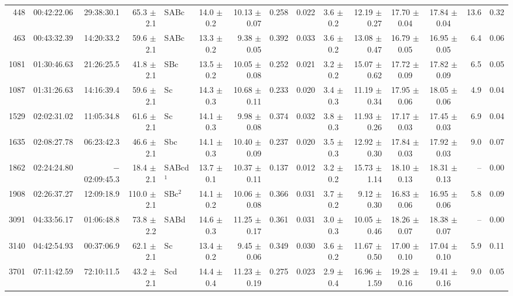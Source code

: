 \begin{table}
{\begin{tabular}{|rrrrlcrcccrccrc|}
\hline  
  448 & 00:42:22.06 & 29:38:30.1 &  65.3 $\pm$ 2.1 & SABc      & 14.0 $\pm$ 0.2 & 10.13 $\pm$ 0.07 & 0.258 & 0.022 & 3.6 $\pm$ 0.2 & 12.19 $\pm$ 0.27 & 17.70 $\pm$ 0.04 & 17.84 $\pm$ 0.04 & 13.6 & 0.32 \\
  463 & 00:43:32.39 & 14:20:33.2 &  59.6 $\pm$ 2.1 & SABc      & 13.3 $\pm$ 0.2 &  9.38 $\pm$ 0.05 & 0.392 & 0.033 & 3.6 $\pm$ 0.2 & 13.08 $\pm$ 0.47 & 16.79 $\pm$ 0.05 & 16.95 $\pm$ 0.05 & 6.4  & 0.06 \\
 1081 & 01:30:46.63 & 21:26:25.5 &  41.8 $\pm$ 2.1 & SBc       & 13.5 $\pm$ 0.2 & 10.05 $\pm$ 0.08 & 0.252 & 0.021 & 3.2 $\pm$ 0.2 & 15.07 $\pm$ 0.62 & 17.72 $\pm$ 0.09 & 17.82 $\pm$ 0.09 & 6.5  & 0.05 \\
 1087 & 01:31:26.63 & 14:16:39.4 &  59.6 $\pm$ 2.1 & Sc        & 14.3 $\pm$ 0.3 & 10.68 $\pm$ 0.11 & 0.233 & 0.020 & 3.4 $\pm$ 0.3 & 11.19 $\pm$ 0.34 & 17.95 $\pm$ 0.06 & 18.05 $\pm$ 0.06 & 4.9  & 0.04 \\
 1529 & 02:02:31.02 & 11:05:34.8 &  61.6 $\pm$ 2.1 & Sc        & 14.1 $\pm$ 0.3 &  9.98 $\pm$ 0.08 & 0.374 & 0.032 & 3.8 $\pm$ 0.3 & 11.93 $\pm$ 0.26 & 17.17 $\pm$ 0.03 & 17.45 $\pm$ 0.03 & 6.9  & 0.04 \\
 1635 & 02:08:27.78 & 06:23:42.3 &  46.6 $\pm$ 2.1 & Sbc       & 14.1 $\pm$ 0.3 & 10.40 $\pm$ 0.09 & 0.237 & 0.020 & 3.5 $\pm$ 0.3 & 12.92 $\pm$ 0.30 & 17.84 $\pm$ 0.03 & 17.92 $\pm$ 0.03 & 9.0  & 0.07 \\
 1862 & 02:24:24.80 &$-$02:09:45.3& 18.4 $\pm$ 2.1 & SABcd$^1$ & 13.7 $\pm$ 0.1 & 10.37 $\pm$ 0.11 & 0.137 & 0.012 & 3.2 $\pm$ 0.2 & 15.73 $\pm$ 1.14 & 18.10 $\pm$ 0.13 & 18.31 $\pm$ 0.13 & --   & 0.00 \\
 1908 & 02:26:37.27 & 12:09:18.9 & 110.0 $\pm$ 2.1 & SBc$^2$   & 14.1 $\pm$ 0.2 & 10.06 $\pm$ 0.08 & 0.366 & 0.031 & 3.7 $\pm$ 0.2 &  9.12 $\pm$ 0.30 & 16.83 $\pm$ 0.06 & 16.95 $\pm$ 0.06 & 5.8  & 0.09 \\
 3091 & 04:33:56.17 & 01:06:48.8 &  73.8 $\pm$ 2.2 & SABd      & 14.6 $\pm$ 0.3 & 11.25 $\pm$ 0.17 & 0.361 & 0.031 & 3.0 $\pm$ 0.3 & 10.05 $\pm$ 0.46 & 18.26 $\pm$ 0.07 & 18.38 $\pm$ 0.07 & --   & 0.00 \\
 3140 & 04:42:54.93 & 00:37:06.9 &  62.1 $\pm$ 2.1 & Sc        & 13.4 $\pm$ 0.2 &  9.45 $\pm$ 0.06 & 0.349 & 0.030 & 3.6 $\pm$ 0.2 & 11.67 $\pm$ 0.50 & 17.00 $\pm$ 0.10 & 17.04 $\pm$ 0.10 & 5.9  & 0.11 \\
 3701 & 07:11:42.59 & 72:10:11.5 &  43.2 $\pm$ 2.1 & Scd       & 14.4 $\pm$ 0.4 & 11.23 $\pm$ 0.19 & 0.275 & 0.023 & 2.9 $\pm$ 0.4 & 16.96 $\pm$ 1.59 & 19.28 $\pm$ 0.16 & 19.41 $\pm$ 0.16 & 9.0  & 0.05 \\

\end{tabular}}
\end{table}
